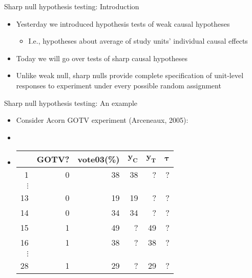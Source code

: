\documentclass[table, xcolor = {dvipsnames}, 9pt]{beamer}
\theoremstyle{plain}
\begin{document}
\begin{frame}{Sharp null hypothesis testing: Introduction}
\vfill
\begin{itemize}
\item Yesterday we introduced hypothesis tests of weak causal hypotheses \pause \vfill
\begin{itemize} \vfill
\item I.e., hypotheses about average of study units' individual causal effects \pause \vfill
\end{itemize} \vfill
\item Today we will go over tests of sharp causal hypotheses \vfill
\item Unlike weak null, sharp nulls provide complete specification of unit-level responses to experiment under every possible random assignment \vfill
\end{itemize} \vfill
\end{frame}
\begin{frame}{Sharp null hypothesis testing: An example}
\begin{itemize}
\item Consider Acorn GOTV experiment (Arceneaux, 2005): \pause 
\item[]
\item[]
\begin{center}
  \begin{tabular}{r|rr|rrr}
  \hline
 & GOTV? & vote03(\%)& $\bm{y_C}$ & $\bm{y_T}$ & $\bm{\tau}$\\
  \hline
1 & 0 & 38 & 38 & ? & ?\\
$\vdots$& & & & & \\
13 & 0 & 19 & 19& ? & ?\\
14 & 0 & 34 & 34& ? & ?\\
15 & 1 & 49 & ?& 49 & ?\\
16 & 1 & 38 & ?& 38 & ?\\
$\vdots$& & & & & \\
28 & 1 & 29 & ?& 29 & ? \\
   \hline
\end{tabular}
\end{center}
\end{itemize}  
\end{frame}
\end{document}
